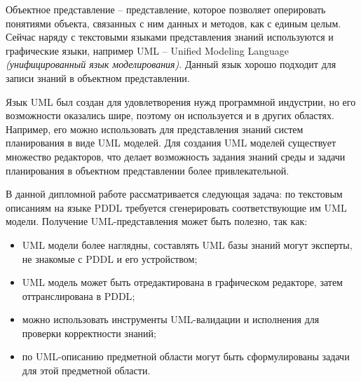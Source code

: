 \documentclass[a4paper,14pt]{extreport}
\begin{document}
    Объектное представление -- представление, которое позволяет оперировать понятиями объекта, связанных с ним данных и методов, как с единым целым. Сейчас наряду с текстовыми языками представления знаний используются и графические языки, например UML\cite{rambo-uml2} -- Unified Modeling Language \textit{(унифицированный язык моделирования)}. Данный язык хорошо подходит для записи знаний в объектном представлении. 
    
    Язык UML был создан для удовлетворения нужд программной индустрии, но его возможности оказались шире, поэтому он используется и в других областях. Например, его можно использовать для представления знаний систем планирования в виде UML моделей. Для создания UML моделей существует множество редакторов, что делает возможность задания знаний среды и задачи планирования в объектном представлении более привлекательной.
    
    В данной дипломной работе рассматривается следующая задача: по текстовым описаниям на языке PDDL требуется сгенерировать соответствующие им UML модели. Получение UML-представления может быть полезно, так как:
    \begin{itemize}
        \item UML модели более наглядны, составлять UML базы знаний могут эксперты, не знакомые с PDDL и его устройством;
        \item UML модель может быть отредактирована в графическом редакторе, затем оттранслирована в PDDL\cite{mal-manz};
        \item можно использовать инструменты UML-валидации и исполнения для проверки корректности знаний\cite{use, gladkova}; 
        \item по UML-описанию предметной области могут быть сформулированы задачи для этой предметной области\cite{dolotkazin}.
    \end{itemize}
\end{document}
